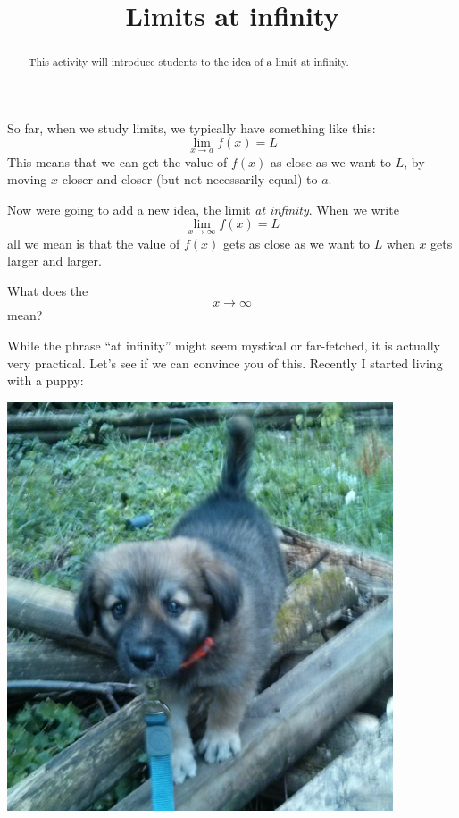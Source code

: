 \documentclass{ximera}
\title{Limits at infinity}
\begin{document}
\begin{abstract}
  This activity will introduce students to the idea of a limit at infinity.
\end{abstract}
\maketitle

So far, when we study limits, we typically have something like this:
\[
\lim_{x\to a} f(x) = L
\]
This means that we can get the value of $f(x)$ as close as we want to
$L$, by moving $x$ closer and closer (but not necessarily equal) to $a$. 

Now were going to add a new idea, the limit \textit{at infinity}. When
we write
\[
\lim_{x\to \infty} f(x) = L
\]
all we mean is that the value of $f(x)$ gets as close as we want to
$L$ when $x$ gets larger and larger. 


\begin{question}
What does the
\[
x\to \infty
\]
mean?
\begin{multipleChoice}
\end{multipleChoice}
\end{question}

While the phrase ``at infinity'' might seem mystical or far-fetched,
it is actually very practical. Let's see if we can convince you of
this. Recently I started living with a puppy:

\begin{image}
\includegraphics{puppy.png}
\end{image}
\end{document}
